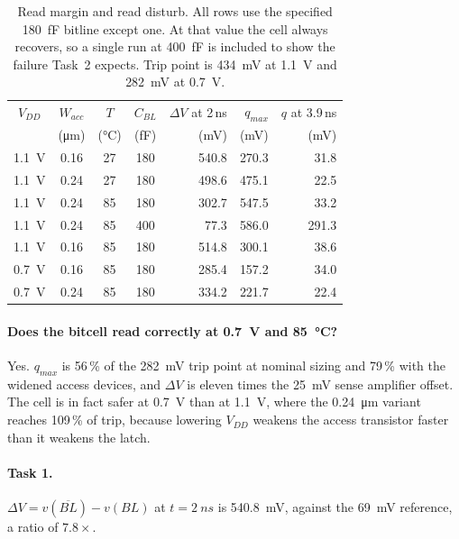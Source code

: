 \documentclass[9pt,a4paper]{extarticle}
\begin{document}
\begin{table}[!ht]\centering\small
\caption{Read margin and read disturb. All rows use the specified
\SI{180}{fF} bitline except one. At that value the cell always recovers,
so a single run at \SI{400}{fF} is included to show the failure Task~2
expects. Trip point is \SI{434}{mV} at \SI{1.1}{V} and \SI{282}{mV} at
\SI{0.7}{V}.}
\label{tab:a}
\renewcommand{\arraystretch}{1.2}
\begin{tabular}{|c|c|c|c|r|r|r|}
\hline
$V_{DD}$ & $W_{acc}$ & $T$ & $C_{BL}$ & $\Delta V$ at 2\,ns & $q_{max}$ & $q$ at 3.9\,ns \\
 & (\si{\micro m}) & (\si{\celsius}) & (fF) & (mV) & (mV) & (mV) \\
\hline
\SI{1.1}{V} & 0.16 & 27 & 180 & 540.8 & 270.3 &  31.8 \\
\hline
\SI{1.1}{V} & 0.24 & 27 & 180 & 498.6 & 475.1 &  22.5 \\
\hline
\SI{1.1}{V} & 0.24 & 85 & 180 & 302.7 & 547.5 &  33.2 \\
\hline
\SI{1.1}{V} & 0.24 & 85 & 400 &  77.3 & 586.0 & 291.3 \\
\hline
\SI{1.1}{V} & 0.16 & 85 & 180 & 514.8 & 300.1 &  38.6 \\
\hline
\SI{0.7}{V} & 0.16 & 85 & 180 & 285.4 & 157.2 &  34.0 \\
\hline
\SI{0.7}{V} & 0.24 & 85 & 180 & 334.2 & 221.7 &  22.4 \\
\hline
\end{tabular}
\end{table}

\paragraph{Does the bitcell read correctly at \SI{0.7}{V} and
\SI{85}{\celsius}?}

Yes. $q_{max}$ is 56\,\% of the \SI{282}{mV} trip point at nominal sizing
and 79\,\% with the widened access devices, and $\Delta V$ is eleven times
the \SI{25}{mV} sense amplifier offset. The cell is in fact safer at
\SI{0.7}{V} than at \SI{1.1}{V}, where the \SI{0.24}{\micro m} variant
reaches 109\,\% of trip, because lowering $V_{DD}$ weakens the access
transistor faster than it weakens the latch.

\paragraph{Task 1.}

$\Delta V = v(\overline{BL}) - v(BL)$ at $t = \SI{2}{ns}$ is
\SI{540.8}{mV}, against the \SI{69}{mV} reference, a ratio of
$7.8\times$.
\end{document}
